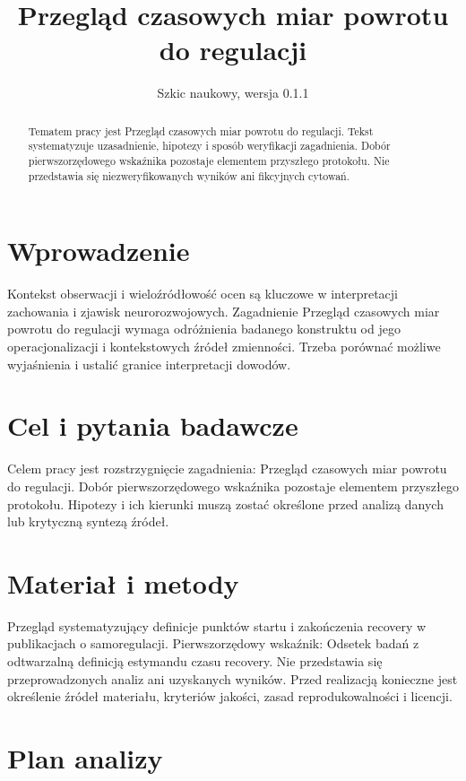 \documentclass[11pt,a4paper]{article}
\title{Przegląd czasowych miar powrotu do regulacji}
\author{}
\date{Szkic naukowy, wersja 0.1.1}
\begin{document}
\maketitle

\begin{abstract}

Tematem pracy jest Przegląd czasowych miar powrotu do regulacji. Tekst systematyzuje uzasadnienie, hipotezy i sposób weryfikacji zagadnienia. Dobór pierwszorzędowego wskaźnika pozostaje elementem przyszłego protokołu. Nie przedstawia się niezweryfikowanych wyników ani fikcyjnych cytowań.

\end{abstract}

\section{Wprowadzenie}

Kontekst obserwacji i wieloźródłowość ocen są kluczowe w interpretacji zachowania i zjawisk neurorozwojowych. Zagadnienie Przegląd czasowych miar powrotu do regulacji wymaga odróżnienia badanego konstruktu od jego operacjonalizacji i kontekstowych źródeł zmienności. Trzeba porównać możliwe wyjaśnienia i ustalić granice interpretacji dowodów.

\section{Cel i pytania badawcze}

Celem pracy jest rozstrzygnięcie zagadnienia: Przegląd czasowych miar powrotu do regulacji. Dobór pierwszorzędowego wskaźnika pozostaje elementem przyszłego protokołu. Hipotezy i ich kierunki muszą zostać określone przed analizą danych lub krytyczną syntezą źródeł.

\section{Materiał i metody}

Przegląd systematyzujący definicje punktów startu i zakończenia recovery w publikacjach o samoregulacji. Pierwszorzędowy wskaźnik: Odsetek badań z odtwarzalną definicją estymandu czasu recovery. Nie przedstawia się przeprowadzonych analiz ani uzyskanych wyników. Przed realizacją konieczne jest określenie źródeł materiału, kryteriów jakości, zasad reprodukowalności i licencji.

\section{Plan analizy}
\end{document}
